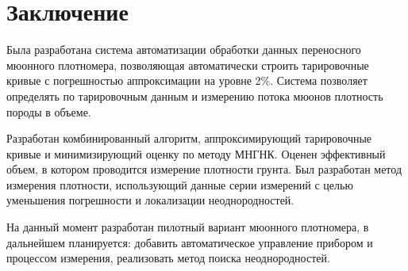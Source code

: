 \chapter*{Заключение}						%

Была разработана система автоматизации обработки данных переносного мюонного плотномера, позволяющая автоматически строить тарировочные кривые с
погрешностью аппроксимации на уровне 2\%. Система позволяет определять по тарировочным данным и измерению потока мюонов 
плотность породы в объеме. 

Разработан комбинированный алгоритм, аппроксимирующий тарировочные кривые и минимизирующий оценку по методу МНГНК. Оценен эффективный объем, в котором проводится измерение плотности грунта. Был разработан 
метод измерения плотности, использующий данные серии измерений с целью уменьшения погрешности и локализации 
неоднородностей.

На данный момент разработан пилотный вариант мюонного плотномера, в дальнейшем планируется: добавить автоматическое 
управление прибором и процессом измерения, реализовать метод поиска неоднородностей.


\clearpage